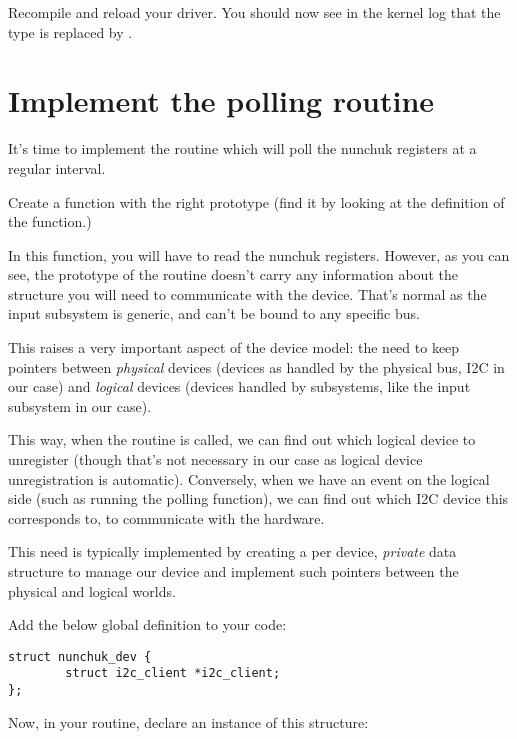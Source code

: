 
Recompile and reload your driver. You should now see in the kernel log
that the  type is replaced by
.

\section{Implement the polling routine}

It's time to implement the routine which will poll the nunchuk registers
at a regular interval.

Create a  function with the right prototype (find
it by looking at the definition of the  function.)

In this function, you will have to read the nunchuk registers. However,
as you can see, the prototype of the  routine doesn't
carry any information about the  structure you will
need to communicate with the device. That's normal as the input
subsystem is generic, and can't be bound to any specific bus.

This raises a very important aspect of the device model: the need to
keep pointers between {\em physical} devices (devices as handled by the
physical bus, I2C in our case) and {\em logical} devices (devices
handled by subsystems, like the input subsystem in our case).

This way, when the  routine is called, we can find out
which logical device to unregister (though that's not necessary in our
case as logical device unregistration is automatic). Conversely, when we
have an event on the logical side (such as running the polling
function), we can find out which I2C device this corresponds to,
to communicate with the hardware.

This need is typically implemented by creating a per device, {\em private} data
structure to manage our device and implement such pointers between
the physical and logical worlds.

Add the below global definition to your code:

\begin{verbatim}
struct nunchuk_dev {
        struct i2c_client *i2c_client;
};
\end{verbatim}

Now, in your  routine, declare an instance of
this structure:

